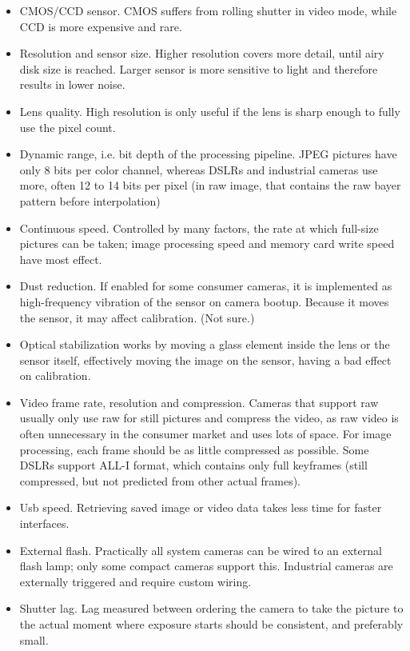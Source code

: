\begin{itemize}
\item CMOS/CCD sensor. CMOS suffers from rolling shutter in video mode, while CCD is more expensive and rare.
\item Resolution and sensor size. Higher resolution covers more detail, until airy disk size is reached. Larger sensor is more sensitive to light and therefore results in lower noise.
\item Lens quality. High resolution is only useful if the lens is sharp enough to fully use the pixel count.
\item Dynamic range, i.e. bit depth of the processing pipeline. JPEG pictures have only 8 bits per color channel, whereas DSLRs and industrial cameras use more, often 12 to 14 bits per pixel (in raw image, that contains the raw bayer pattern before interpolation)
\item Continuous speed. Controlled by many factors, the rate at which full-size pictures can be taken; image processing speed and memory card write speed have most effect.
\item Dust reduction. If enabled for some consumer cameras, it is implemented as high-frequency vibration of the sensor on camera bootup. Because it moves the sensor, it may affect calibration. (Not sure.)
\item Optical stabilization works by moving a glass element inside the lens or the sensor itself, effectively moving the image on the sensor, having a bad effect on calibration.
\item Video frame rate, resolution and compression. Cameras that support raw usually only use raw for still pictures and compress the video, as raw video is often unnecessary in the consumer market and uses lots of space. For image processing, each frame should be as little compressed as possible. Some DSLRs support ALL-I format, which contains only full keyframes (still compressed, but not predicted from other actual frames).
\item Usb speed. Retrieving saved image or video data takes less time for faster interfaces.
\item External flash. Practically all system cameras can be wired to an external flash lamp; only some compact cameras support this. Industrial cameras are externally triggered and require custom wiring.
\item Shutter lag. Lag measured between ordering the camera to take the picture to the actual moment where exposure starts should be consistent, and preferably small.

\end{itemize}
